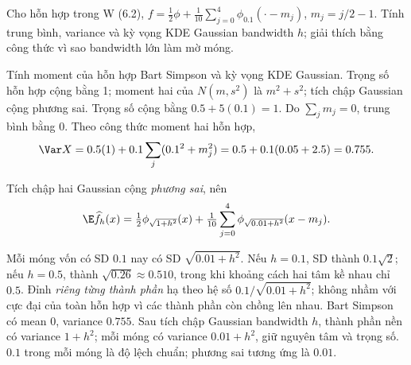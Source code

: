 \begin{problem}\label{k:52}
Cho hỗn hợp trong W (6.2), $f=\tfrac12\phi+\tfrac1{10}\sum_{j=0}^4\phi_{0.1}(\cdot-m_j)$, $m_j=j/2-1$. Tính trung bình, variance và kỳ vọng KDE Gaussian bandwidth $h$; giải thích bằng công thức vì sao bandwidth lớn làm mờ móng.
\end{problem}
\begin{solution}
Tính moment của hỗn hợp Bart Simpson và kỳ vọng KDE Gaussian.
Trọng số hỗn hợp cộng bằng 1; moment hai của $N(m,s^2)$ là $m^2+s^2$; tích chập Gaussian cộng phương sai.
Trọng số cộng bằng $0.5+5(0.1)=1$. Do $\sum_jm_j=0$, trung bình bằng 0. Theo công thức moment hai hỗn hợp,
\[
 \Var X=0.5(1)+0.1\sum_j(0.1^2+m_j^2)
 =0.5+0.1(0.05+2.5)=0.755.
\]

Tích chập hai Gaussian cộng \emph{phương sai}, nên
\[
 \E\widehat f_h(x)=\tfrac12\phi_{\sqrt{1+h^2}}(x)
 +\tfrac1{10}\sum_{j=0}^4\phi_{\sqrt{0.01+h^2}}(x-m_j).
\]

Mỗi móng vốn có SD $0.1$ nay có SD $\sqrt{0.01+h^2}$. Nếu $h=0.1$, SD thành $0.1\sqrt2$; nếu $h=0.5$, thành $\sqrt{0.26}\approx0.510$, trong khi khoảng cách hai tâm kề nhau chỉ $0.5$.
Đỉnh \emph{riêng từng thành phần} hạ theo hệ số $0.1/\sqrt{0.01+h^2}$; không nhầm với cực đại của toàn hỗn hợp vì các thành phần còn chồng lên nhau.
Bart Simpson có mean 0, variance $0.755$. Sau tích chập Gaussian bandwidth $h$, thành phần nền có variance $1+h^2$; mỗi móng có variance $0.01+h^2$, giữ nguyên tâm và trọng số.
$0.1$ trong mỗi móng là độ lệch chuẩn; phương sai tương ứng là $0.01$.
\end{solution}

